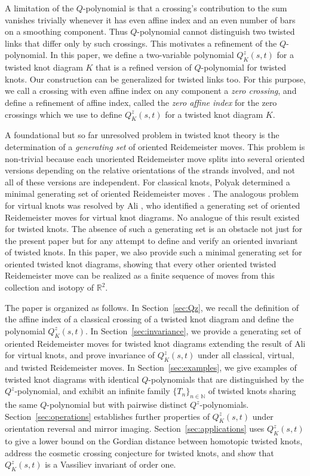 \documentclass[10pt,a4paper,reqno]{amsart}
\theoremstyle{definition}
\theoremstyle{remark}
\begin{document}
A limitation of the $Q$-polynomial is that a crossing's contribution to the sum vanishes trivially whenever it has even affine index and an even number of bars on a smoothing component. Thus $Q$-polynomial cannot distinguish two twisted links that differ only by such crossings. This motivates a refinement of the $Q$-polynomial. In this paper, we define a two-variable polynomial $Q^{z}_{K}(s,t)$ for a twisted knot diagram $K$ that is a refined version of $Q$-polynomial for twisted knots. Our construction can be generalized for twisted links too. For this purpose, we call a crossing with even affine index on any component a \emph{zero crossing}, and define a refinement of affine index, called the \emph{zero affine index} for the zero crossings which we use to define $Q^{z}_{K}(s,t)$ for a twisted knot diagram $K$. 

A foundational but so far unresolved problem in twisted knot theory 
is the determination of a \emph{generating set} of oriented 
Reidemeister moves. This problem is non-trivial 
because each unoriented Reidemeister move splits into several oriented versions depending on the relative orientations of the strands involved, and not all of these versions are independent. 
For classical knots, Polyak determined a minimal 
generating set of oriented Reidemeister moves \cite{Polyak}. The analogous problem for virtual knots was 
resolved by Ali \cite{Dan}, who identified a generating 
set of oriented Reidemeister moves for virtual knot diagrams. No analogue of this result existed for twisted knots. 
The absence of such a generating set is an obstacle not just for 
the present paper but for any attempt to define and verify an 
oriented invariant of twisted knots. In this paper, we also provide such a minimal generating set for oriented twisted knot diagrams, showing that every other oriented twisted 
Reidemeister move can be realized as a finite sequence of moves 
from this collection and isotopy of $\mathbb{R}^{2}$.

The paper is organized as follows. In Section~\ref{sec:Qz}, we recall the definition of the affine index of a classical crossing of a twisted knot diagram and define the polynomial $Q^{z}_{K}(s,t)$. In Section~\ref{sec:invariance}, we provide a generating set of oriented Reidemeister moves for twisted knot diagrams extending the result of Ali \cite{Dan} for virtual knots, and prove invariance of $Q^{z}_{K}(s,t)$ under all classical, virtual, and twisted Reidemeister moves. In Section~\ref{sec:examples}, we give examples of twisted knot diagrams with identical
$Q$-polynomials that are distinguished by the $Q^z$-polynomial, and exhibit an infinite family $\{T_n\}_{n \in \mathbb{N}}$ of twisted knots sharing the same $Q$-polynomial but with pairwise distinct $Q^z$-polynomials. Section~\ref{sec:operations} establishes further properties of $Q^{z}_{K}(s,t)$ under orientation reversal and mirror imaging. Section~\ref{sec:applications} uses $Q^{z}_{K}(s,t)$ to give a lower bound on the Gordian distance between homotopic twisted knots, address the cosmetic crossing conjecture for twisted knots, and show that $Q^{z}_{K}(s,t)$ is a Vassiliev invariant of order one.
\end{document}
